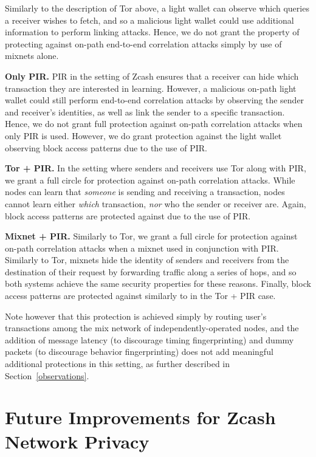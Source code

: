\documentclass{article}
\begin{document}
Similarly to the description of Tor above, a light wallet can observe which
queries a receiver wishes to fetch, and so a malicious light wallet could use
additional information to perform linking attacks. Hence, we do not grant the
property of protecting against on-path end-to-end correlation attacks simply by
use of mixnets alone.

\textbf{Only PIR.}
PIR in the setting of Zcash ensures that a receiver can hide which transaction
they are interested in learning. However, a malicious on-path light wallet
could still perform end-to-end correlation attacks by observing the sender and
receiver's identities, as well as link the sender to a specific transaction.
Hence, we do not grant full protection against on-path correlation attacks when
only PIR is used. However, we do grant protection against the light wallet
observing block access patterns due to the use of PIR.

\textbf{Tor + PIR.}
In the setting where senders and receivers use Tor along with PIR, we grant a
full circle for protection against on-path correlation
attacks.
While nodes can learn that \emph{someone} is sending and receiving a
transaction, nodes cannot learn either \emph{which} transaction, \emph{nor} who
the sender or receiver are.
Again, block access patterns are protected against due to the use of PIR.

\textbf{Mixnet + PIR.}
Similarly to Tor, we grant a full circle for protection against on-path
correlation attacks when a mixnet used in
conjunction with PIR. Similarly to Tor, mixnets hide the identity of senders
and receivers from the destination of their request by forwarding traffic along
a series of hops, and so both systems achieve the same security properties for
these reasons.
Finally, block access patterns are protected against similarly to in the Tor +
PIR case.

Note however that this protection is
achieved simply by routing user's transactions among the mix network of
independently-operated nodes, and the addition of message latency (to
discourage timing fingerprinting) and dummy packets (to discourage behavior
fingerprinting) does not add meaningful additional protections in this setting,
as further described in Section~\ref{observations}.

\section{Future Improvements for Zcash Network Privacy}
\label{future-improvements}
\end{document}
